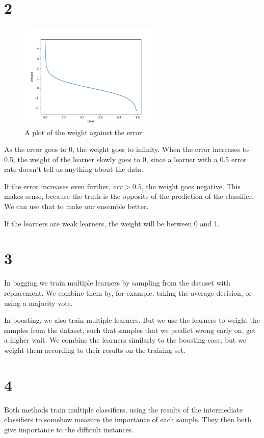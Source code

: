 \documentclass[11pt]{article}
\begin{document}
\section*{2}

\begin{figure}[h]
	\centering
	\includegraphics[width=0.6\textwidth]{images/ex2_2}
	\caption{A plot of the weight against the error}
\end{figure}
As the error goes to 0, the weight goes to infinity. When the error increases to 0.5, the weight of the learner slowly goes to 0, since a learner with a 0.5 error rate doesn't tell us anything about the data. 

If the error increases even further, $err>0.5$, the weight goes negative. This makes sense, because the truth is the opposite of the prediction of the classifier. We can use that to make our ensemble better.

If the learners are weak learners, the weight will be between 0 and 1.

\section*{3}

In bagging we train multiple learners by sampling from the dataset with replacement. We combine them by, for example, taking the average decision, or using a majority vote.

In boosting, we also train multiple learners. But we use the learners to weight the samples from the dataset, such that samples that we predict wrong early on, get a higher wait. We combine the learners similarly to the boosting case, but we weight them according to their results on the training set.

\section*{4}
Both methods train multiple classifiers, using the results of the intermediate classifiers to somehow measure the importance of each sample. They then both give importance to the difficult instances.
\end{document}
